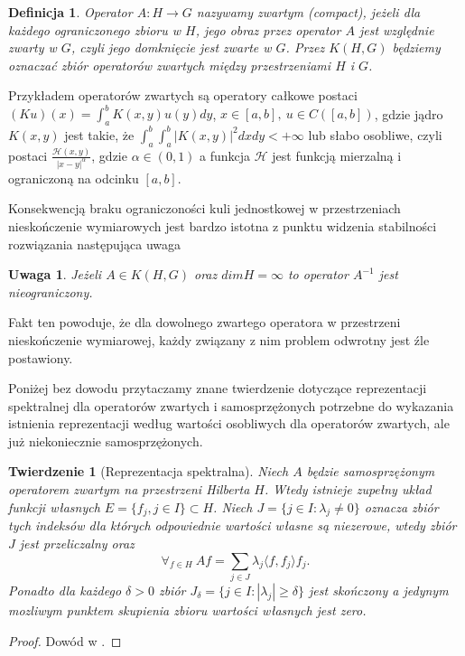 \documentclass{article}
\newtheorem{tw}{Twierdzenie}
\newtheorem{df}{Definicja}
\newtheorem{uw}{Uwaga}
\begin{document}
\begin{df}
Operator $A\colon H \to G$ nazywamy zwartym (\textit{compact}), jeżeli dla każdego ograniczonego zbioru w $H$, jego obraz przez operator $A$ jest względnie zwarty w $G$, czyli jego domknięcie jest zwarte w $G$. Przez $K(H,G)$ będziemy oznaczać zbiór operatorów zwartych między przestrzeniami $H$ i $G$.
\end{df}

Przykładem operatorów zwartych są operatory całkowe postaci $\left(Ku\right)(x)=\int_a^bK(x,y)u(y)dy$, $x\in [a,b],\ u\in C([a,b])$, gdzie jądro $K(x,y)$ jest takie, że $\int_a^b\int_a^b|K(x,y)|^2dxdy<+\infty$ lub słabo osobliwe, czyli postaci $\frac{\mathcal{H}(x,y)}{|x-y|^{\alpha}}$, gdzie $\alpha\in (0,1)$ a funkcja $\mathcal{H}$ jest funkcją mierzalną i ograniczoną na odcinku $[a,b]$.

Konsekwencją braku ograniczoności kuli jednostkowej w przestrzeniach nieskończenie wymiarowych jest bardzo istotna z punktu widzenia stabilności rozwiązania następująca uwaga
\begin{uw}
Jeżeli $A\in K(H,G)$ oraz $dimH=\infty$ to operator $A^{-1}$ jest nieograniczony.
\end{uw}
Fakt ten powoduje, że dla dowolnego zwartego operatora w przestrzeni nieskończenie wymiarowej, każdy związany z nim problem odwrotny jest źle postawiony.

Poniżej bez dowodu przytaczamy znane twierdzenie dotyczące reprezentacji spektralnej dla operatorów zwartych i samosprzężonych potrzebne do wykazania istnienia reprezentacji według wartości osobliwych dla operatorów zwartych, ale już niekoniecznie samosprzężonych.

\begin{tw}[Reprezentacja spektralna]
Niech $A$ będzie samosprzężonym operatorem zwartym na przestrzeni Hilberta $H$. Wtedy istnieje zupełny układ funkcji własnych $E=\{f_j,j\in I\}\subset H$. Niech $J=\{j\in I\colon\lambda_j\neq 0\}$ oznacza zbiór tych indeksów dla których odpowiednie wartości własne są niezerowe, wtedy zbiór $J$ jest przeliczalny oraz 
\begin{displaymath}
\forall_{f\in H}\ Af=\sum_{j\in J}\lambda_j\langle f,f_j\rangle f_j.
\end{displaymath}
Ponadto dla każdego $\delta>0$ zbiór $J_{\delta}=\{j\in I\colon |\lambda_j|\geq \delta\}$ jest skończony a jedynym mozliwym punktem skupienia zbioru wartości własnych jest zero.
\end{tw}
\begin{proof}
Dowód w \cite{iphde}.
\end{proof}
\end{document}
